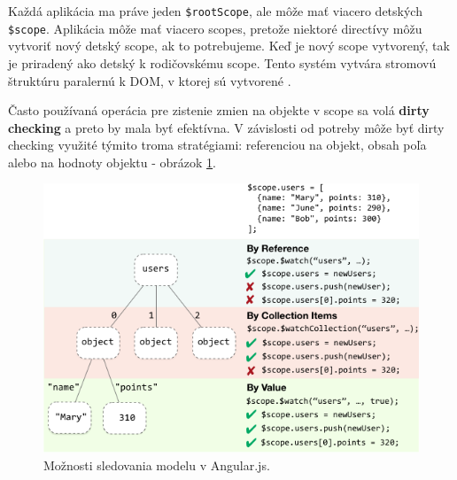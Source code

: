 Každá aplikácia ma práve jeden \verb|$rootScope|, ale môže mať viacero detských \verb|$scope|. Aplikácia môže mať viacero scopes, pretože niektoré directívy môžu vytvoriť nový detský scope, ak to potrebujeme. Keď je nový scope vytvorený, tak je priradený ako detský k rodičovskému scope. Tento systém vytvára stromovú štruktúru paralernú k DOM, v ktorej sú vytvorené \cite{angular-docs}.

Často používaná operácia pre zistenie zmien na objekte v scope sa volá \textbf{dirty checking} a preto by mala byť efektívna. V závislosti od potreby môže byť dirty checking využité týmito troma stratégiami: referenciou na objekt, obsah poľa alebo na hodnoty objektu - obrázok \ref{img-angular-watch}.

\begin{figure}[H]
  \centering
  \includegraphics[scale=0.7]{img/angular/concepts-scope-watch-strategies.png}
  \caption{Možnosti sledovania modelu v Angular.js.}
  \label{img-angular-watch}
\end{figure}

